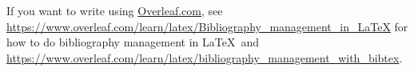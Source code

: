 \documentclass{article}
\begin{document}
If you want to write using \url{Overleaf.com}, see \url{https://www.overleaf.com/learn/latex/Bibliography_management_in_LaTeX} for how to do bibliography management in \LaTeX\ and \url{https://www.overleaf.com/learn/latex/bibliography_management_with_bibtex}.






\nocite{*}
	
	
	

	
\end{document}
